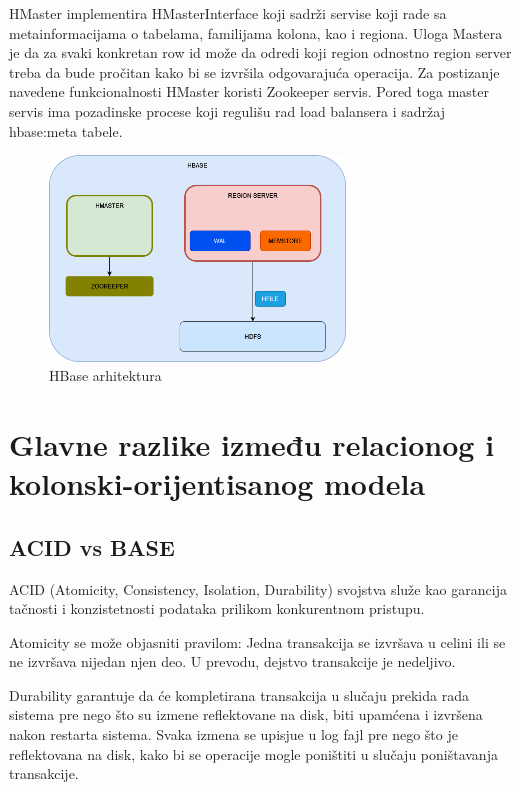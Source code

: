 \documentclass[12pt,oneside]{memoir}
\begin{document}
HMaster implementira HMasterInterface koji sadrži servise koji rade sa metainformacijama o tabelama, familijama kolona, kao i regiona. Uloga Mastera je da za svaki konkretan row id može da odredi koji region odnostno region server treba da bude pročitan kako bi se izvršila odgovarajuća operacija. Za postizanje navedene funkcionalnosti HMaster koristi Zookeeper \cite{BigTable} servis. Pored toga master servis ima pozadinske procese koji regulišu rad load balansera i sadržaj hbase:meta tabele.

\begin{figure}[!ht]
  \centering
  \includegraphics[width=0.7\textwidth]{hbase-arhitektura.png}
  \caption{HBase arhitektura}
  \label{fig:grafikon}
\end{figure}

\pagebreak

\section{Glavne razlike između relacionog i kolonski-orijentisanog modela}

\subsection{ACID vs BASE}

ACID (Atomicity, Consistency, Isolation, Durability) svojstva služe kao garancija tačnosti i konzistetnosti podataka prilikom konkurentnom pristupu. 

Atomicity se može objasniti pravilom: Jedna transakcija se izvršava u celini ili se ne izvršava nijedan njen deo. U prevodu, dejstvo transakcije je nedeljivo. 

Durability garantuje da će kompletirana transakcija u slučaju prekida rada sistema pre nego što su izmene reflektovane na disk, biti upamćena i izvršena nakon restarta sistema. Svaka izmena se upisjue u log fajl pre nego što je reflektovana na disk, kako bi se operacije mogle poništiti u slučaju poništavanja transakcije.
\end{document}
